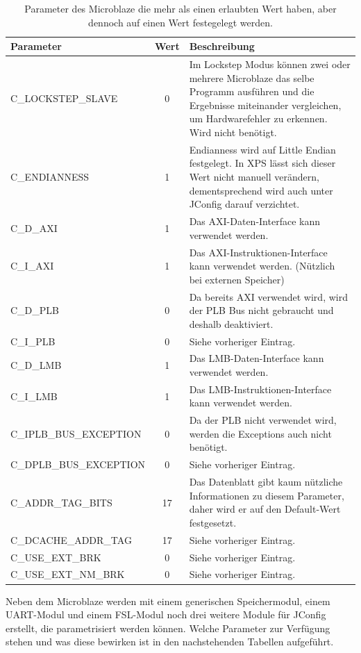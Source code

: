 \begin{table}[ht!]
	\begin{tabular}{|l|c|p{10cm}|}
		\hline \textbf{Parameter} & \textbf{Wert} & \textbf{Beschreibung} \\ 
		\hline C\_LOCKSTEP\_SLAVE & 0 & Im Lockstep Modus können zwei oder mehrere \newline Microblaze das selbe Programm ausführen und die Ergebnisse miteinander vergleichen, um Hardwarefehler zu erkennen. Wird nicht benötigt.\\ 
		\hline C\_ENDIANNESS & 1 & Endianness wird auf Little Endian festgelegt. In XPS lässt sich dieser Wert nicht manuell verändern, dementsprechend wird auch unter JConfig darauf verzichtet.\\ 
		\hline C\_D\_AXI & 1 & Das AXI-Daten-Interface kann verwendet werden. \\ 
		\hline C\_I\_AXI & 1 & Das AXI-Instruktionen-Interface kann verwendet werden. (Nützlich bei externen Speicher) \\ 
		\hline C\_D\_PLB & 0 & Da bereits AXI verwendet wird, wird der PLB Bus nicht gebraucht und deshalb deaktiviert. \\ 
		\hline C\_I\_PLB & 0 & Siehe vorheriger Eintrag. \\ 
		\hline C\_D\_LMB & 1 & Das LMB-Daten-Interface kann verwendet werden. \\ 
		\hline C\_I\_LMB & 1 & Das LMB-Instruktionen-Interface kann verwendet werden. \\ 
		\hline C\_IPLB\_BUS\_EXCEPTION & 0 & Da der PLB nicht verwendet wird, werden die Exceptions auch nicht benötigt. \\ 
		\hline C\_DPLB\_BUS\_EXCEPTION & 0 & Siehe vorheriger Eintrag. \\ 
		\hline C\_ADDR\_TAG\_BITS & 17 & Das Datenblatt gibt kaum nützliche Informationen zu diesem Parameter, daher wird er auf den Default-Wert festgesetzt. \\ 
		\hline C\_DCACHE\_ADDR\_TAG & 17 & Siehe vorheriger Eintrag. \\ 
		\hline C\_USE\_EXT\_BRK & 0 & Siehe vorheriger Eintrag. \\ 
		\hline C\_USE\_EXT\_NM\_BRK & 0 & Siehe vorheriger Eintrag. \\ 
		\hline 
	\end{tabular}
	\centering
	\caption{Parameter des Microblaze die mehr als einen erlaubten Wert haben, aber dennoch auf einen Wert festegelegt werden.}
	\label{tab:MicParam}
\end{table}
Neben dem Microblaze werden mit einem generischen Speichermodul, einem UART-Modul und einem FSL-Modul noch drei weitere Module für JConfig erstellt, die parametrisiert werden können. Welche Parameter zur Verfügung stehen und was diese bewirken ist in den nachstehenden Tabellen aufgeführt.

